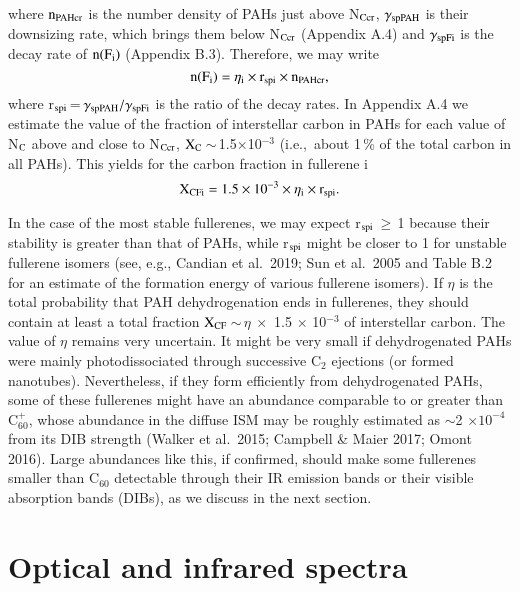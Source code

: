 \documentclass{aa}
\begin{document}
where ${\rm n_{PAHcr}}$ is the  number density of PAHs just above  N$_{\rm Ccr}$, $\gamma_{\rm spPAH}$ is their downsizing rate, which brings them below   N$_{\rm Ccr}$ (Appendix A.4) and  $\gamma_{\rm spFi}$ is the decay rate of ${\rm n(F_i)}$ (Appendix B.3). Therefore, we may write 
\begin{equation}
{\rm n(F_i) = \eta_i \times r_{spi} \times n_{PAHcr} }
,\end{equation}
where r$_{\rm spi}$\,=\,${\rm \gamma_{spPAH}/\gamma_{spFi}}$ is the ratio of the decay rates. In Appendix A.4 we estimate the value of the fraction of interstellar carbon in PAHs for each value of N$_{\rm C}$ above and close to N$_{\rm Ccr}$, ${\rm X_{C}}$\,$\sim$\,1.5$\times$10$^{-3}$ (i.e.,\ about 1\,\% of the total carbon in all PAHs). This yields for the carbon fraction in fullerene i
\begin{equation}
{\rm X_{CFi} = 1.5 \times 10^{-3} \times \eta_i \times r_{spi}}
.\end{equation}

 In the case of the most stable fullerenes, we may expect  r$_{\rm spi}$\,$\ge$\,1   because their stability is greater than that of PAHs, while  r$_{\rm spi}$ might be closer to 1 
for unstable fullerene isomers (see, e.g., Candian et al.\ 2019; Sun et al.\ 2005 and Table B.2 for an estimate of the formation energy of various 
fullerene isomers). If $\eta$ is the total probability that PAH dehydrogenation ends in  fullerenes, 
they should contain at least a total fraction ${\rm X_{CF}}$\,$\sim$\,$\eta  ~ \times$ 1.5 $\times$ 10$^{-3}$ of interstellar carbon. 
The value of $\eta$ remains very uncertain. It might be very small if dehydrogenated PAHs were mainly photodissociated through successive C$_2$ ejections (or formed nanotubes). Nevertheless, if 
they form efficiently from dehydrogenated PAHs, some of these fullerenes 
might have an abundance comparable to or greater than C$_{60}^+$, whose abundance in the diffuse ISM may be roughly estimated as $\sim$2 $\times 10^{-4}$ from its DIB strength (Walker et al.\ 2015; Campbell \& Maier 2017; Omont 2016). Large abundances like this, if confirmed,  should make some fullerenes smaller than C$_{60}$ detectable through their IR emission 
bands or their visible absorption bands (DIBs), as we discuss in the next 
section.


\section{Optical and infrared spectra}
\end{document}
